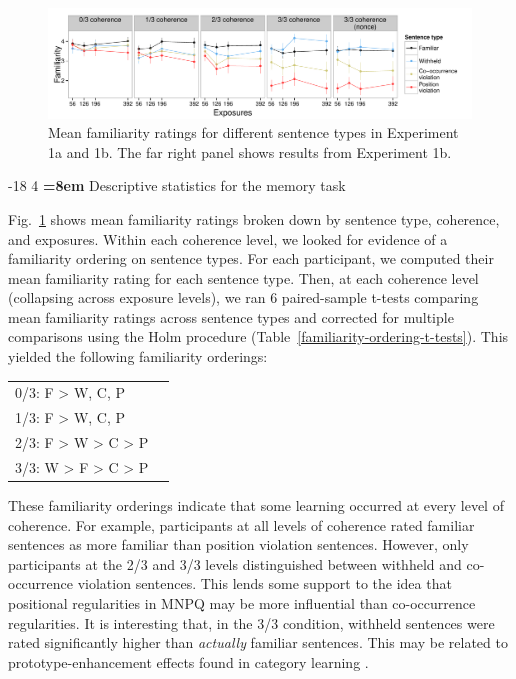 \documentclass[man,longtable, floatmark]{my-apa6}
\makeatletter
\renewcommand\subsubsection{\@startsection{subsubsection}{3}{\z@}%
                       {-18\p@ \@plus -4\p@ \@minus -4\p@}%
                       {4\p@ \@plus 2\p@ \@minus 2\p@}%
                       {\normalfont\normalsize\bfseries\boldmath
                        \rightskip=\z@ \@plus 8em\pretolerance=10000 }}
\makeatother
\begin{document}
\begin{figure}[t]
  \begin{center}
    \includegraphics[width=1.0\linewidth]{x1-descriptive-memory}
    \caption{Mean familiarity ratings for different sentence types in Experiment 1a and 1b. The far right panel shows results from Experiment 1b.}
    \label{x1-descriptive-mem}
  \end{center}
\end{figure}

\subsubsection{Descriptive statistics for the memory task}

Fig.~\ref{x1-descriptive-mem} shows mean familiarity ratings broken down by sentence type, coherence, and exposures. Within each coherence level, we looked for evidence of a familiarity ordering on sentence types. For each participant, we computed their mean familiarity rating for each sentence type. Then, at each coherence level (collapsing across exposure levels), we ran 6 paired-sample t-tests comparing mean familiarity ratings across sentence types and corrected for multiple comparisons using the Holm procedure (Table~\ref{familiarity-ordering-t-tests}). This yielded the following familiarity orderings:
\begin{center}
  \begin{tabular}{l l }
    0/3: F > W, C, P & \\
    1/3: F > W, C, P & \\
    2/3: F > W > C > P & \\
    3/3: W > F > C > P & \\
  \end{tabular}
\end{center}
\noindent These familiarity orderings indicate that some learning occurred at every level of coherence. For example, participants at all levels of coherence rated familiar sentences as more familiar than position violation sentences. However, only participants at the 2/3 and 3/3 levels distinguished between withheld and co-occurrence violation sentences. This lends some support to the idea that positional regularities in MNPQ may be more influential than co-occurrence regularities. It is interesting that, in the 3/3 condition, withheld sentences were rated significantly higher than \emph{actually} familiar sentences. This may be related to prototype-enhancement effects found in category learning \citep[e.g.,][]{smith2002}.
\end{document}

